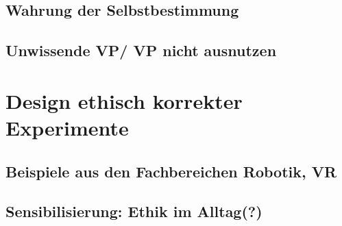 \documentclass[10pt]{beamer}
\begin{document}
\subsection{Wahrung der Selbstbestimmung}

\subsection{Unwissende VP/ VP nicht ausnutzen}

\section{Design ethisch korrekter Experimente}

\subsection{Beispiele aus den Fachbereichen Robotik, VR}


\subsection{Sensibilisierung: Ethik im Alltag(?)}



\end{document}
